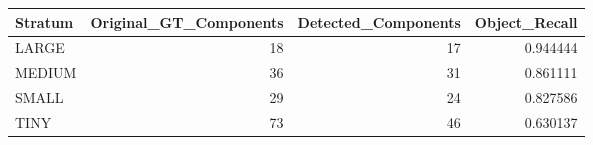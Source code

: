 \begin{tabular}{lrrr}
\toprule
Stratum & Original_GT_Components & Detected_Components & Object_Recall \\
\midrule
LARGE & 18 & 17 & 0.944444 \\
MEDIUM & 36 & 31 & 0.861111 \\
SMALL & 29 & 24 & 0.827586 \\
TINY & 73 & 46 & 0.630137 \\
\bottomrule
\end{tabular}
